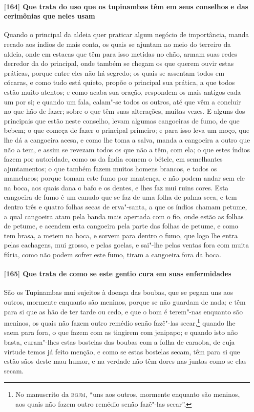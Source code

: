 \paragraph{[164] Que trata do uso que os tupinambas têm em seus conselhos e das cerimônias
que neles usam}\quad
Quando o principal da aldeia quer praticar algum negócio de importância, manda recado aos
índios de mais conta, os quais se ajuntam no meio do terreiro da aldeia, onde em estacas
que têm para isso metidas no chão, armam suas redes derredor da do principal, onde também
se chegam os que querem ouvir estas práticas, porque entre eles não há segredo; os quais
se assentam todos em cócaras, e como tudo está quieto, propõe o principal sua prática, a
que todos estão muito atentos; e como acaba sua oração, respondem os mais antigos cada um
por si; e quando um fala, calam"-se todos os outros, até que vêm a concluir no que hão de
fazer; sobre o que têm suas alterações, muitas vezes. E alguns dos principais que estão
neste conselho, levam algumas cangoeiras de fumo, de que bebem; o que começa de fazer o
principal primeiro; e para isso leva um moço, que lhe dá a cangoeira acesa, e como lhe
toma a salva, manda a cangoeira a outro que não a tem, e assim se revezam todos os que não
a têm, com ela; o que estes índios fazem por autoridade, como os da Índia comem o bétele,
em semelhantes ajuntamentos; o que também fazem muitos homens brancos, e todos os
mamelucos; porque tomam este fumo por mantença, e não podem andar sem ele na boca, aos
quais dana o bafo e os dentes, e lhes faz mui ruins cores. Esta cangoeira de fumo é um
canudo que se faz de uma folha de palma seca, e tem dentro três e quatro folhas secas de
erva"-santa, a que os índios chamam petume, a qual cangoeira atam pela banda mais apertada
com o fio, onde estão as folhas de petume, e acendem esta cangoeira pela parte das folhas
de petume, e como tem brasa, a metem na boca, e sorvem para dentro o fumo, que logo lhe
entra pelas cachagens, mui grosso, e pelas goelas, e sai"-lhe pelas ventas fora com muita
fúria, como não podem sofrer este fumo, tiram a cangoeira fora da boca.

\paragraph{[165] Que trata de como se este gentio cura em suas \mbox{enfermidades}}\quad
São os Tupinambas mui sujeitos à doença das boubas, que se pegam uns aos outros, mormente
enquanto são meninos, porque se não guardam de nada; e têm para si que as hão de ter tarde
ou cedo, e que o bom é terem"-nas enquanto são meninos, os quais não fazem outro remédio
senão fazê"-las secar,\footnote{ No manuscrito da \textsc{bgjm}, ``uns aos outros, mormente
enquanto são meninos, aos quais não fazem outro remédio senão fazê"-las secar''.} quando
lhe saem para fora, o que fazem com as tingirem com jenipapo; e quando isto não basta,
curam"-lhes estas bostelas das boubas com a folha de caraoba, de cuja virtude temos já
feito menção, e como se estas bostelas secam, têm para si que estão sãos deste mau humor,
e na verdade não têm dores nas juntas como se elas secam.

